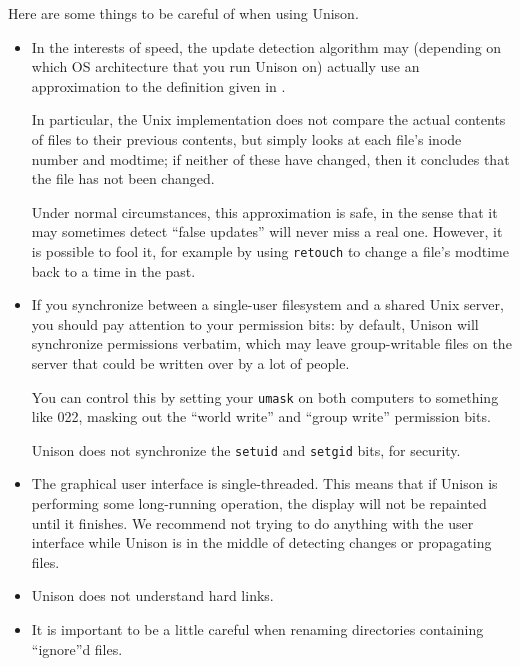 \documentclass{article}
\begin{document}

Here are some things to be careful of when using Unison.  

\begin{itemize}
\item In the interests of speed, the update detection algorithm may
  (depending on which OS architecture that you run Unison on)
  actually use an approximation to the definition given in
  .  

  In particular, the Unix
  implementation does not compare the actual contents of files to their
  previous contents, but simply looks at each file's inode number and
  modtime; if neither of these have changed, then it concludes that the
  file has not been changed.

  Under normal circumstances, this approximation is safe, in the sense
  that it may sometimes detect ``false updates'' will never miss a real
  one.  However, it is possible to fool it, for example by using
  \verb|retouch| to change a file's modtime back to a time in the past.

\item If you synchronize between a single-user filesystem and a shared
Unix server, you should pay attention to your permission bits: by
default, Unison will synchronize permissions verbatim, which may leave
group-writable files on the server that could be written over by a lot of
people.  

You can control this by setting your \verb|umask| on both computers to
something like 022, masking out the ``world write'' and ``group write''
permission bits.  

Unison does not synchronize the \verb|setuid| and \verb|setgid| bits, for
security. 

\item The graphical user interface is single-threaded.  This
means that if Unison is performing some long-running operation, the
display will not be repainted until it finishes.  We recommend not
trying to do anything with the user interface while Unison is in the
middle of detecting changes or propagating files.

\item Unison does not understand hard links.

\item It is important to be a little careful when renaming directories
containing ``ignore''d files. 


\end{itemize}
\end{document}
